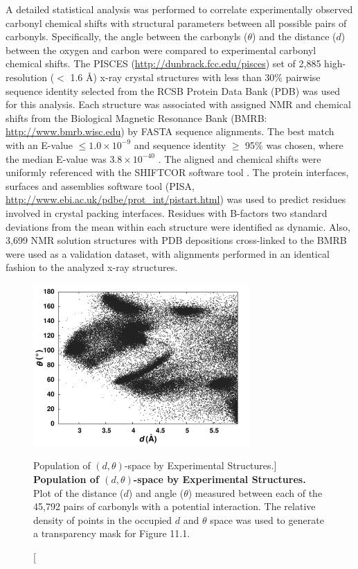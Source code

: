 \begin{doublespace}
A detailed statistical analysis was performed to correlate experimentally
observed carbonyl \cnmr{} chemical shifts with structural parameters between
all possible pairs of carbonyls. Specifically, the angle between the carbonyls
($\theta$) and the distance ($d$) between the oxygen and carbon were compared
to experimental carbonyl \cnmr{} chemical shifts. The PISCES
\cite{wang:binf2003} (\url{http://dunbrack.fcc.edu/pisces}) set of
2,885 high-resolution ($<$ 1.6 \r{A}) x-ray crystal structures with less than
30\% pairwise sequence identity selected from the RCSB Protein Data Bank
(PDB) \cite{berman:nar2000} was used for this analysis. Each structure
was associated with assigned NMR \cnmr{} and \nnmr{} chemical shifts from the
Biological Magnetic Resonance Bank (BMRB: \url{http://www.bmrb.wisc.edu})
\cite{ulrich:nar2008} by FASTA \cite{pearson:mmbio2000}
sequence alignments. The best match with an E-value $\leq 1.0\times10^{-9}$
and sequence identity $\geq$ 95\% was chosen, where the median E-value was
$3.8\times10^{-40}$ . The aligned \cnmr{} and \nnmr{} chemical shifts were
uniformly referenced with the SHIFTCOR software tool
\cite{wishart:jbnmr2003}. The protein interfaces,
surfaces and assemblies software tool
(PISA, \url{http://www.ebi.ac.uk/pdbe/prot_int/pistart.html})
\cite{krissinel:acryst2004} was used to predict residues involved
in crystal packing interfaces. Residues with B-factors two standard deviations
from the mean within each structure were identified as dynamic. Also, 3,699 NMR
solution structures with PDB depositions cross-linked to the BMRB were
used as a validation dataset, with alignments performed in an identical
fashion to the analyzed x-ray structures.
\end{doublespace}

\begin{figure}
\includegraphics[width=3.25in]{figs/npistar/02-dtheta.png}
\caption
      [Population of $(d,\theta)$-space by Experimental Structures.]{
  {\bf Population of $(d,\theta)$-space by Experimental Structures.}
  \\
  Plot of the distance ($d$) and angle ($\theta$) measured between each of
  the 45,792 pairs of carbonyls with a potential \npistar{} interaction. The
  relative density of points in the occupied $d$ and $\theta$ space was used
  to generate a transparency mask for Figure 11.1.
}
\label{figure.11.2}
\end{figure}

